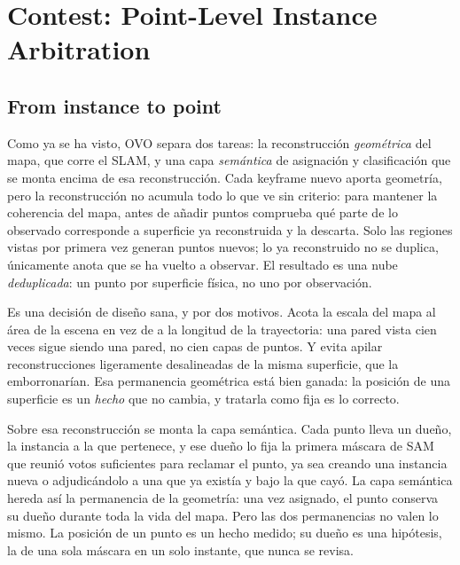 \chapter{Contest: Point-Level Instance Arbitration}
\label{ch:contest}

%

\section{From instance to point}
\label{sec:contest_granularity}

Como ya se ha visto, OVO separa dos tareas: la reconstrucción \emph{geométrica} del
mapa, que corre el SLAM, y una capa \emph{semántica} de asignación y clasificación que se
monta encima de esa reconstrucción. Cada \foreignlanguage{english}{keyframe} nuevo aporta
geometría, pero la reconstrucción no acumula todo lo que ve sin criterio: para mantener la
coherencia del mapa, antes de añadir puntos comprueba qué parte de lo observado
corresponde a superficie ya reconstruida y la descarta. Solo las regiones vistas por
primera vez generan puntos nuevos; lo ya reconstruido no se duplica, únicamente anota que
se ha vuelto a observar. El resultado es una nube \emph{deduplicada}: un punto por
superficie física, no uno por observación.

Es una decisión de diseño sana, y por dos motivos. Acota la escala del mapa al área de la
escena en vez de a la longitud de la trayectoria: una pared vista cien veces sigue siendo
una pared, no cien capas de puntos. Y evita apilar reconstrucciones ligeramente
desalineadas de la misma superficie, que la emborronarían. Esa permanencia geométrica está
bien ganada: la posición de una superficie es un \emph{hecho} que no cambia, y tratarla
como fija es lo correcto.

Sobre esa reconstrucción se monta la capa semántica. Cada punto lleva un dueño, la
instancia a la que pertenece, y ese dueño lo fija la primera máscara de SAM que reunió
votos suficientes para reclamar el punto, ya sea creando una instancia nueva o adjudicándolo
a una que ya existía y bajo la que cayó. La capa semántica hereda así la permanencia de la
geometría: una vez asignado, el punto conserva su dueño durante toda la vida del mapa. Pero las dos permanencias no valen lo mismo. La
posición de un punto es un hecho medido; su dueño es una hipótesis, la de una sola máscara
en un solo instante, que nunca se revisa.

